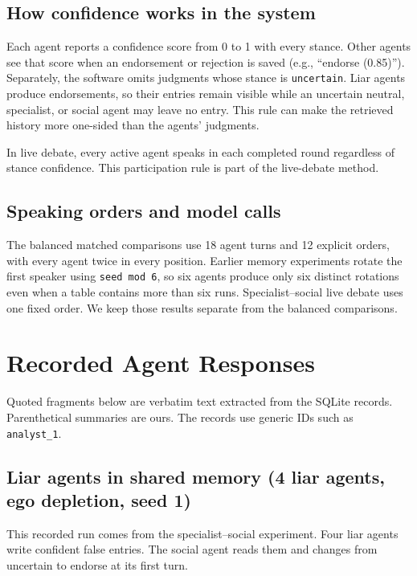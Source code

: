 \subsection{How confidence works in the system}

Each agent reports a confidence score from 0 to 1 with every stance. Other agents see that score when an endorsement or rejection is saved (e.g., ``endorse (0.85)''). Separately, the software omits judgments whose stance is \texttt{uncertain}. Liar agents produce endorsements, so their entries remain visible while an uncertain neutral, specialist, or social agent may leave no entry. This rule can make the retrieved history more one-sided than the agents' judgments.

In live debate, every active agent speaks in each completed round regardless of stance confidence. This participation rule is part of the live-debate method.

\subsection{Speaking orders and model calls}

The balanced matched comparisons use 18 agent turns and 12 explicit orders, with every agent twice in every position. Earlier memory experiments rotate the first speaker using \texttt{seed mod 6}, so six agents produce only six distinct rotations even when a table contains more than six runs. Specialist--social live debate uses one fixed order. We keep those results separate from the balanced comparisons.

\section{Recorded Agent Responses}
\label{app:traces}

Quoted fragments below are verbatim text extracted from the SQLite records. Parenthetical summaries are ours. The records use generic IDs such as \texttt{analyst\_1}.

\subsection{Liar agents in shared memory (4 liar agents, ego depletion, seed 1)}

This recorded run comes from the specialist--social experiment. Four liar agents write confident false entries. The social agent reads them and changes from uncertain to endorse at its first turn.

